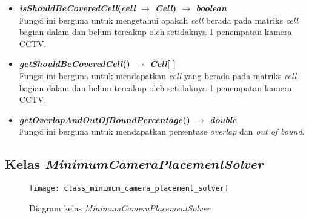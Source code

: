\begin{itemize}
	\item \textbf{\textit{isShouldBeCoveredCell}(\textit{cell} \(\rightarrow\) \textit{Cell}) \(\rightarrow\) \textit{boolean}}\\
	Fungsi ini berguna untuk mengetahui apakah \textit{cell} berada pada matriks \textit{cell} bagian dalam dan belum tercakup oleh setidaknya 1 penempatan kamera CCTV.
	\item \textbf{\textit{getShouldBeCoveredCell}() \(\rightarrow\) \textit{Cell}[ ]}\\
	Fungsi ini berguna untuk mendapatkan \textit{cell} yang berada pada matriks \textit{cell} bagian dalam dan belum tercakup oleh setidaknya 1 penempatan kamera CCTV.
	\item \textbf{\textit{getOverlapAndOutOfBoundPercentage}() \(\rightarrow\) \textit{double}}\\
	Fungsi ini berguna untuk mendapatkan persentase \textit{overlap} dan \textit{out of bound}.
\end{itemize}

\subsection{Kelas \textit{MinimumCameraPlacementSolver}}
\begin{figure}[H]
	\centering  
	\texttt{[image: class\_minimum\_camera\_placement\_solver]}
	\caption[Diagram kelas \textit{MinimumCameraPlacementSolver}]{Diagram kelas \textit{MinimumCameraPlacementSolver}}
	\label{fig:class_minimum_camera_placement_solver}
\end{figure}

